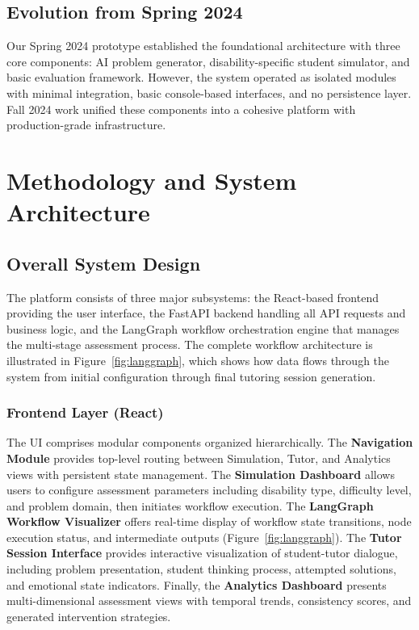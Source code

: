\documentclass[11pt]{article}
\begin{document}
\subsection{Evolution from Spring 2024}

Our Spring 2024 prototype established the foundational architecture with three core components: AI problem generator, disability-specific student simulator, and basic evaluation framework. However, the system operated as isolated modules with minimal integration, basic console-based interfaces, and no persistence layer. Fall 2024 work unified these components into a cohesive platform with production-grade infrastructure.

\section{Methodology and System Architecture}

\subsection{Overall System Design}

The platform consists of three major subsystems: the React-based frontend providing the user interface, the FastAPI backend handling all API requests and business logic, and the LangGraph workflow orchestration engine that manages the multi-stage assessment process. The complete workflow architecture is illustrated in Figure~\ref{fig:langgraph}, which shows how data flows through the system from initial configuration through final tutoring session generation.

\subsubsection{Frontend Layer (React)}

The UI comprises modular components organized hierarchically. The \textbf{Navigation Module} provides top-level routing between Simulation, Tutor, and Analytics views with persistent state management. The \textbf{Simulation Dashboard} allows users to configure assessment parameters including disability type, difficulty level, and problem domain, then initiates workflow execution. The \textbf{LangGraph Workflow Visualizer} offers real-time display of workflow state transitions, node execution status, and intermediate outputs (Figure~\ref{fig:langgraph}). The \textbf{Tutor Session Interface} provides interactive visualization of student-tutor dialogue, including problem presentation, student thinking process, attempted solutions, and emotional state indicators. Finally, the \textbf{Analytics Dashboard} presents multi-dimensional assessment views with temporal trends, consistency scores, and generated intervention strategies.
\end{document}

